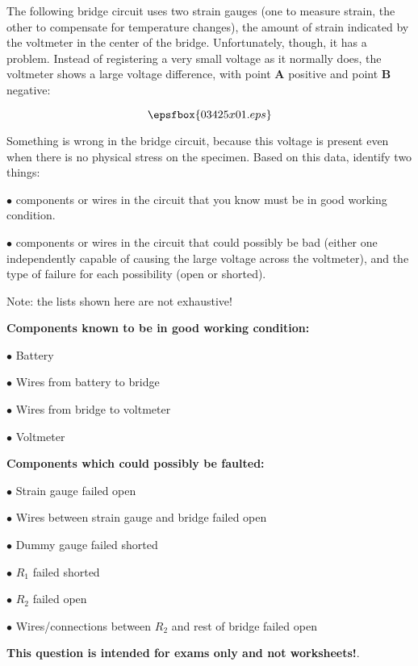 

The following bridge circuit uses two strain gauges (one to measure strain, the other to compensate for temperature changes), the amount of strain indicated by the voltmeter in the center of the bridge.  Unfortunately, though, it has a problem.  Instead of registering a very small voltage as it normally does, the voltmeter shows a large voltage difference, with point {\bf A} positive and point {\bf B} negative:

$$\epsfbox{03425x01.eps}$$

\goodbreak
Something is wrong in the bridge circuit, because this voltage is present even when there is no physical stress on the specimen.  Based on this data, identify two things:

\vskip 10pt

\medskip
\item{$\bullet$}  components or wires in the circuit that you know must be in good working condition.
\vskip 40pt
\item{$\bullet$}  components or wires in the circuit that could possibly be bad (either one independently capable of causing the large voltage across the voltmeter), and the type of failure for each possibility (open or shorted).
\medskip







Note: the lists shown here are not exhaustive!

\vskip 10pt

\goodbreak
\noindent
{\bf Components known to be in good working condition:}

\medskip
\item{$\bullet$} Battery
\item{$\bullet$} Wires from battery to bridge
\item{$\bullet$} Wires from bridge to voltmeter
\item{$\bullet$} Voltmeter
\medskip

\vskip 10pt

\goodbreak
\noindent
{\bf Components which could possibly be faulted:}

\medskip
\item{$\bullet$} Strain gauge failed open
\item{$\bullet$} Wires between strain gauge and bridge failed open
\item{$\bullet$} Dummy gauge failed shorted
\item{$\bullet$} $R_1$ failed shorted
\item{$\bullet$} $R_2$ failed open
\item{$\bullet$} Wires/connections between $R_2$ and rest of bridge failed open
\medskip







{\bf This question is intended for exams only and not worksheets!}.



